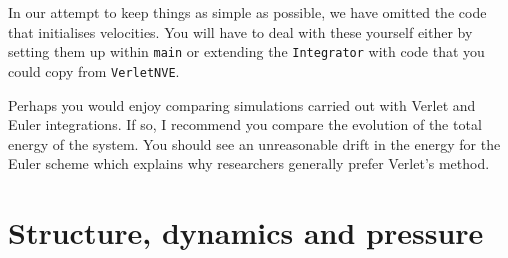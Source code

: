 In our attempt to keep things as simple as possible, we have omitted the code 
that initialises velocities. You will have to deal with these yourself either by 
setting them up within \texttt{main} or extending the \texttt{Integrator} with 
code that you could copy from \texttt{VerletNVE}.

Perhaps you would enjoy comparing simulations carried out with Verlet and Euler 
integrations. If so, I recommend you compare the evolution of the total energy 
of the system. You should see an unreasonable drift in the energy for the Euler 
scheme which explains why researchers generally prefer Verlet's method.

\section{Structure, dynamics and pressure}

